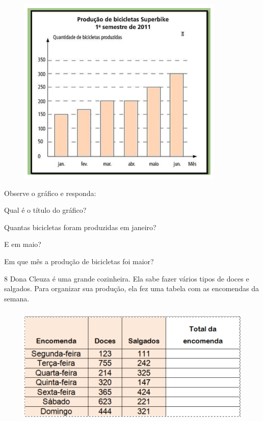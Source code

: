 \begin{figure}[h!]
\centering\includegraphics[width=3.875in,height=3.57292in]{./imgSAEB_6_MAT/media/image85.png}
\end{figure}

Observe o gráfico e responda:

\begin{escolha}
\item Qual é o título do gráfico? 
\item Quantas bicicletas foram produzidas em janeiro? 
\item E em maio? 
\item Em que mês a produção de bicicletas foi maior? 
\end{escolha}

\num{8}  Dona Cleuza é uma grande cozinheira. Ela sabe fazer vários tipos de
doces e salgados. Para organizar sua produção, ela fez uma tabela com as
encomendas da semana.

\begin{figure}[h]
\centering\includegraphics[width=4.88403in,height=2.27917in]{./imgSAEB_6_MAT/media/image86.png}
\end{figure}


